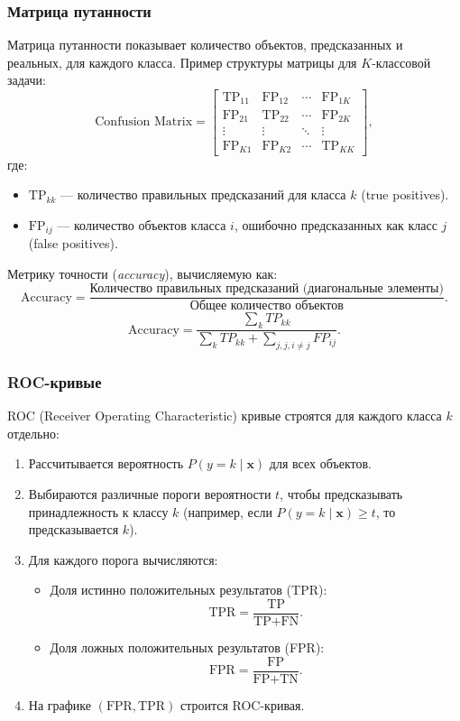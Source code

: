 \subsubsection{Матрица путанности}
Матрица путанности показывает количество объектов, предсказанных и реальных, для каждого класса. Пример структуры матрицы для \( K \)-классовой задачи:
\[
\text{Confusion Matrix} = 
\begin{bmatrix}
	\text{TP}_{11} & \text{FP}_{12} & \cdots & \text{FP}_{1K} \\
	\text{FP}_{21} & \text{TP}_{22} & \cdots & \text{FP}_{2K} \\
	\vdots & \vdots & \ddots & \vdots \\
	\text{FP}_{K1} & \text{FP}_{K2} & \cdots & \text{TP}_{KK}
\end{bmatrix},
\]
где:
\begin{itemize}
	\item \( \text{TP}_{kk} \) — количество правильных предсказаний для класса \( k \) (true positives).
	\item \( \text{FP}_{ij} \) — количество объектов класса \( i \), ошибочно предсказанных как класс \( j \) (false positives).
\end{itemize}
Метрику точности (\textit{accuracy}), вычисляемую как:
\[
\text{Accuracy} = \frac{\text{Количество правильных предсказаний (диагональные элементы)}}{\text{Общее количество объектов}}.
\]
\[
\text{Accuracy} = \frac{\sum_k TP_{kk}}{\sum_k TP_{kk} + \sum_{j, j, i \ne j} FP_{ij}}.
\]

\subsubsection{ROC-кривые}
ROC (Receiver Operating Characteristic) кривые строятся для каждого класса \( k \) отдельно:
\begin{enumerate}
	\item Рассчитывается вероятность \( P(y = k \mid \mathbf{x}) \) для всех объектов.
	\item Выбираются различные пороги вероятности \( t \), чтобы предсказывать принадлежность к классу \( k \) (например, если \( P(y = k \mid \mathbf{x}) \geq t \), то предсказывается \( k \)).
	\item Для каждого порога вычисляются:
	\begin{itemize}
		\item Доля истинно положительных результатов (TPR):
		\[
		\text{TPR} = \frac{\text{TP}}{\text{TP} + \text{FN}}.
		\]
		\item Доля ложных положительных результатов (FPR):
		\[
		\text{FPR} = \frac{\text{FP}}{\text{FP} + \text{TN}}.
		\]
	\end{itemize}
	\item На графике \( (\text{FPR}, \text{TPR}) \) строится ROC-кривая.
\end{enumerate}

